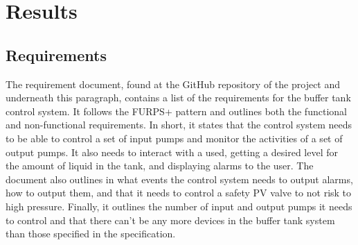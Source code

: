 \documentclass[11pt, A4paper, english]{article}
\begin{document}
	\section{Results}
		\subsection{Requirements}
The requirement document, found at the GitHub repository of the project \cite{github} and underneath this paragraph, contains a list of the requirements for the buffer tank control system. It follows the FURPS+ pattern and outlines both the functional and non-functional requirements. In short, it states that the control system needs to be able to control a set of input pumps and monitor the activities of a set of output pumps. It also needs to interact with a used, getting a desired level for the amount of liquid in the tank, and displaying alarms to the user. The document also outlines in what events the control system needs to output alarms, how to output them, and that it needs to control a safety PV valve to not risk to high pressure. Finally, it outlines the number of input and output pumps it needs to control and that there can't be any more devices in the buffer tank system than those specified in the specification. \\

\end{document}

